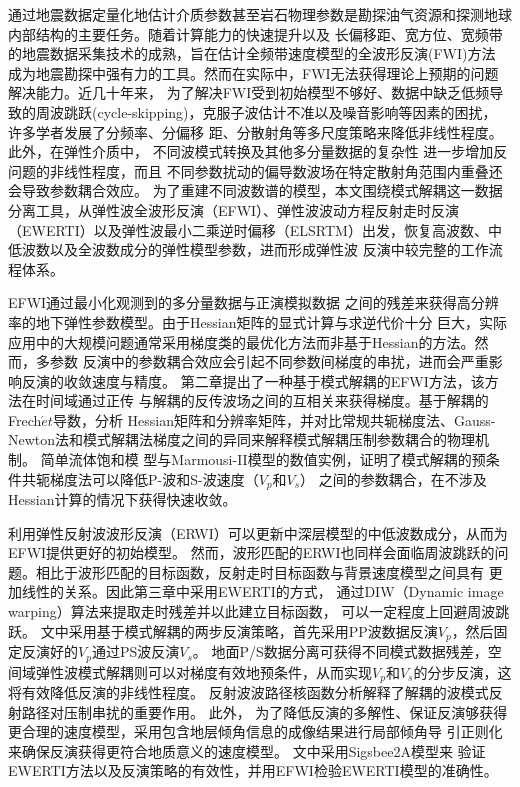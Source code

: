 \begin{cabstract}
	通过地震数据定量化地估计介质参数甚至岩石物理参数是勘探油气资源和探测地球内部结构的主要任务。随着计算能力的快速提升以及
	长偏移距、宽方位、宽频带的地震数据采集技术的成熟，旨在估计全频带速度模型的全波形反演(FWI)方法
	成为地震勘探中强有力的工具。然而在实际中，FWI无法获得理论上预期的问题解决能力。近几十年来，
	为了解决FWI受到初始模型不够好、数据中缺乏低频导致的周波跳跃(cycle-skipping)，克服子波估计不准以及噪音影响等因素的困扰，
	许多学者发展了分频率、分偏移
	距、分散射角等多尺度策略来降低非线性程度。此外，在弹性介质中，
	不同波模式转换及其他多分量数据的复杂性
	进一步增加反问题的非线性程度，而且
	不同参数扰动的偏导数波场在特定散射角范围内重叠还会导致参数耦合效应。
	为了重建不同波数谱的模型，本文围绕模式解耦这一数据分离工具，从弹性波全波形反演（EFWI）、弹性波波动方程反射走时反演
	（EWERTI）以及弹性波最小二乘逆时偏移（ELSRTM）出发，恢复高波数、中低波数以及全波数成分的弹性模型参数，进而形成弹性波
	反演中较完整的工作流程体系。

	EFWI通过最小化观测到的多分量数据与正演模拟数据
	之间的残差来获得高分辨率的地下弹性参数模型。由于Hessian矩阵的显式计算与求逆代价十分
	巨大，实际应用中的大规模问题通常采用梯度类的最优化方法而非基于Hessian的方法。然而，多参数
	反演中的参数耦合效应会引起不同参数间梯度的串扰，进而会严重影响反演的收敛速度与精度。
	第二章提出了一种基于模式解耦的EFWI方法，该方法在时间域通过正传
	与解耦的反传波场之间的互相关来获得梯度。基于解耦的Frech$\acute{e}t$导数，分析
	Hessian矩阵和分辨率矩阵，并对比常规共轭梯度法、Gauss-Newton法和模式解耦法梯度之间的异同来解释模式解耦压制参数耦合的物理机制。
	简单流体饱和模
	型与Marmousi-II模型的数值实例，证明了模式解耦的预条件共轭梯度法可以降低P-波和S-波速度（$V_p$和$V_s$）
	之间的参数耦合，在不涉及Hessian计算的情况下获得快速收敛。

	利用弹性反射波波形反演（ERWI）可以更新中深层模型的中低波数成分，从而为EFWI提供更好的初始模型。
	然而，波形匹配的ERWI也同样会面临周波跳跃的问题。相比于波形匹配的目标函数，反射走时目标函数与背景速度模型之间具有
	更加线性的关系。因此第三章中采用EWERTI的方式，
	通过DIW（Dynamic image warping）算法来提取走时残差并以此建立目标函数，
	可以一定程度上回避周波跳跃。
	文中采用基于模式解耦的两步反演策略，首先采用PP波数据反演$V_p$，然后固定反演好的$V_p$通过PS波反演$V_s$。
	地面P/S数据分离可获得不同模式数据残差，空间域弹性波模式解耦则可以对梯度有效地预条件，从而实现$V_p$和$V_s$的分步反演，这将有效降低反演的非线性程度。
	反射波波路径核函数分析解释了解耦的波模式反射路径对压制串扰的重要作用。
	此外，
	为了降低反演的多解性、保证反演够获得更合理的速度模型，采用包含地层倾角信息的成像结果进行局部倾角导
	引正则化来确保反演获得更符合地质意义的速度模型。
	文中采用Sigsbee2A模型来
	验证EWERTI方法以及反演策略的有效性，并用EFWI检验EWERTI模型的准确性。


\end{cabstract}

